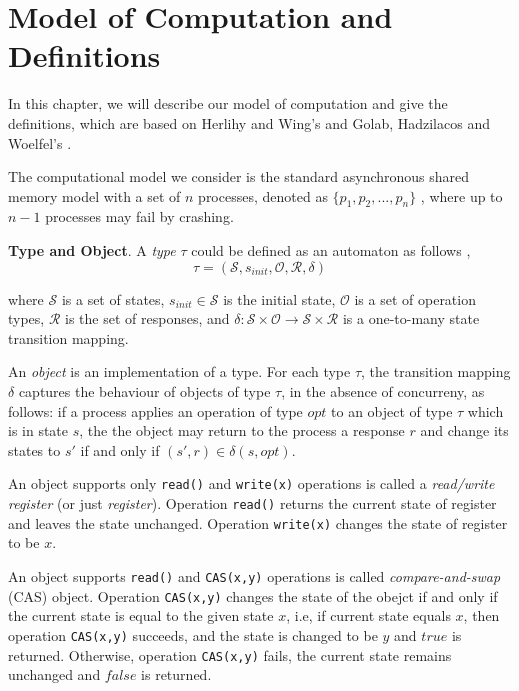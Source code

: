 
\chapter{Model of Computation and Definitions}
In this chapter, we will describe our model of computation and give the definitions, which are based on Herlihy
and Wing's \cite{Herlihy:1990:LCC:78969.78972} and Golab, Hadzilacos and Woelfel's \cite{InProc-GHHW2007a}.

The computational model we consider is the standard asynchronous shared memory model with a set of $n$ processes,
denoted as $\{p_1, p_2,...,p_n\}$ , where up to $n-1$ processes may fail by crashing.


\textbf{Type and Object}.
A \emph{type} $\tau$ could be defined as an automaton as follows \cite{InProc-GHHW2007a},
$$\tau = (\mathcal{S}, s_{init},\mathcal{O},\mathcal{R} ,\delta )$$

where $\mathcal{S}$ is a set of states, $s_{init} \in \mathcal{S}$ is the initial state, $\mathcal{O}$ is a set of
operation types, $\mathcal{R}$ is the set of responses, and
$\delta :\mathcal{S} \times \mathcal{O} \to \mathcal{S} \times \mathcal{R}$ is a one-to-many state transition mapping.

An \emph{object} is an implementation of a type. For each type $\tau$, the transition mapping $\delta$ captures the
behaviour of objects of type $\tau$, in the absence of concurreny,
as follows: if a process applies an operation of type $opt$ to an object of type $\tau$ which is in state $s$, the the object
may return to the process a response $r$ and change its states to $s'$ if and only if $(s', r) \in \delta(s, opt)$.

An object supports only \texttt{read()} and \texttt{write(x)} operations is called a \emph{read/write register}
(or just \emph{register}). Operation \texttt{read()} returns the current state of register and leaves the state unchanged.
Operation \texttt{write(x)} changes the state of register to be $x$.

An object supports \texttt{read()} and \texttt{CAS(x,y)} operations is called \emph{compare-and-swap} (CAS) object.
Operation \texttt{CAS(x,y)} changes the state of the obejct if and only if the current state is equal to the given state $x$, i.e,
if current state equals $x$, then operation \texttt{CAS(x,y)} succeeds, and the state is changed
to be $y$ and $true$ is returned. Otherwise, operation \texttt{CAS(x,y)} fails, the current state remains unchanged and
$false$ is returned.

